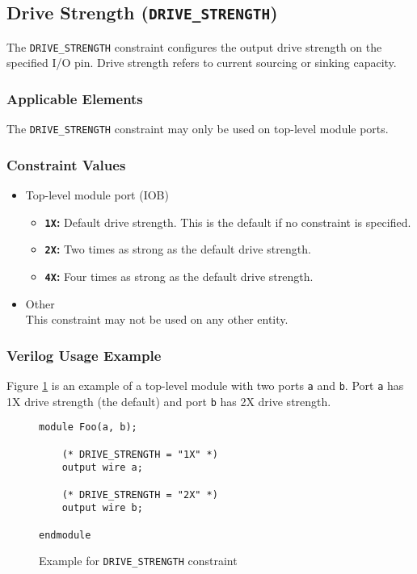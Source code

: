 \documentclass[11pt]{article}
\newcommand{\tokenstyle}[1]{\texttt{#1}}
\newcommand{\wirestyle}[1]{\texttt{#1}}
\newcommand{\valuestyle}[1]{\texttt{#1}}
\newcommand{\strvaluestyle}[1]{\valuestyle{\textquotedbl#1\textquotedbl}}
\newcommand{\strexamplestyle}[1]{\textbf{\strvaluestyle{#1}:}}
\newcommand{\whenstyle}[1]{{\fontseries{sb}\selectfont#1}}
\begin{document}
\pagebreak
\subsection{Drive Strength (\tokenstyle{DRIVE\_STRENGTH})}

The \tokenstyle{DRIVE\_STRENGTH} constraint configures the output drive strength on the specified I/O pin. Drive strength refers to current sourcing or sinking capacity.

\subsubsection{Applicable Elements}
The \tokenstyle{DRIVE\_STRENGTH} constraint may only be used on top-level module ports.

\subsubsection{Constraint Values}
\begin{itemize}
\item \whenstyle{Top-level module port (IOB)}
	\begin{itemize}
		\item \strexamplestyle{1X} Default drive strength. This is the default if no constraint is specified.
		\item \strexamplestyle{2X} Two times as strong as the default drive strength.
		\item \strexamplestyle{4X} Four times as strong as the default drive strength.
	\end{itemize}
\item \whenstyle{Other} \\
This constraint may not be used on any other entity.
\end{itemize}

\subsubsection{Verilog Usage Example}

Figure \ref{constraint-drivestrength} is an example of a top-level module with two ports \wirestyle{a} and \wirestyle{b}. Port \wirestyle{a} has 1X drive strength (the default) and port \wirestyle{b} has 2X drive strength.

\begin{figure}[h]
\begin{lstlisting}
module Foo(a, b);

	(* DRIVE_STRENGTH = "1X" *)
	output wire a;

	(* DRIVE_STRENGTH = "2X" *)
	output wire b;

endmodule
\end{lstlisting}
\caption{Example for \tokenstyle{DRIVE\_STRENGTH} constraint}
\label{constraint-drivestrength}
\end{figure}
\end{document}
